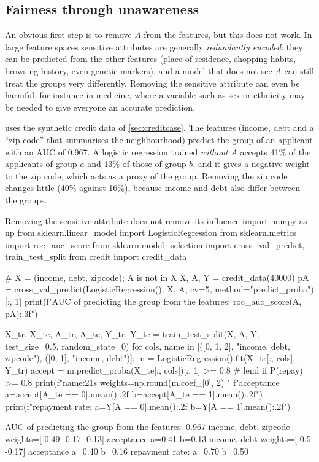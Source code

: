 \subsection{Fairness through unawareness}

An obvious first step is to remove $A$ from the features, but this does not work. In large feature
spaces sensitive attributes are generally \emph{redundantly encoded}: they can be predicted from
the other features (place of residence, shopping habits, browsing history, even genetic markers),
and a model that does not see $A$ can still treat the groups very differently. Removing the
sensitive attribute can even be harmful, for instance in medicine, where a variable such as sex
or ethnicity may be needed to give everyone an accurate prediction.

 uses the synthetic credit data of \cref{sec:creditcase}. The features
(income, debt and a ``zip code'' that summarises the neighbourhood) predict the group of an
applicant with an AUC of 0.967. A logistic regression trained \emph{without} $A$ accepts 41\% of
the applicants of group $a$ and 13\% of those of group $b$, and it gives a negative weight to the
zip code, which acts as a proxy of the group. Removing the zip code changes little (40\% against
16\%), because income and debt also differ between the groups.

\begin{pylisting}[label={lst:unawareness}]{Removing the sensitive attribute does not remove its influence}
import numpy as np
from sklearn.linear_model import LogisticRegression
from sklearn.metrics import roc_auc_score
from sklearn.model_selection import cross_val_predict, train_test_split
from credit import credit_data

# X = (income, debt, zipcode); A is not in X
X, A, Y = credit_data(40000)
pA = cross_val_predict(LogisticRegression(), X, A, cv=5, method="predict_proba")[:, 1]
print(f"AUC of predicting the group from the features: {roc_auc_score(A, pA):.3f}")

X_tr, X_te, A_tr, A_te, Y_tr, Y_te = train_test_split(X, A, Y, test_size=0.5,
                                                      random_state=0)
for cols, name in [([0, 1, 2], "income, debt, zipcode"), ([0, 1], "income, debt")]:
    m = LogisticRegression().fit(X_tr[:, cols], Y_tr)
    accept = m.predict_proba(X_te[:, cols])[:, 1] >= 0.8         # lend if P(repay) >= 0.8
    print(f"{name:21s} weights={np.round(m.coef_[0], 2)}  "
          f"acceptance a={accept[A_te == 0].mean():.2f} b={accept[A_te == 1].mean():.2f}")
print(f"repayment rate: a={Y[A == 0].mean():.2f}  b={Y[A == 1].mean():.2f}")
\end{pylisting}
\begin{pyoutput}
AUC of predicting the group from the features: 0.967
income, debt, zipcode weights=[ 0.49 -0.17 -0.13]  acceptance a=0.41 b=0.13
income, debt          weights=[ 0.5  -0.17]  acceptance a=0.40 b=0.16
repayment rate: a=0.70  b=0.50
\end{pyoutput}

